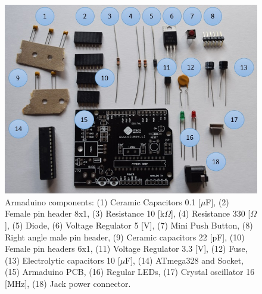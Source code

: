 \documentclass[12pt,letterpaper]{article}
\numberwithin{figure}{section}
\numberwithin{equation}{section}
\numberwithin{table}{section}
\begin{document}
\begin{figure}[H]
    \centering
    \includegraphics[scale=0.65]{Figuras/figure_10.jpg}
    \caption{Armaduino components: (1) Ceramic Capacitors 0.1 [$\mu$F], (2) Female pin header 8x1, (3) Resistance 10 [k$\Omega$], (4) Resistance 330 [$\Omega$], (5) Diode, (6) Voltage Regulator 5 [V], (7) Mini Push Button, (8) Right angle male pin header, (9) Ceramic capacitors 22 [pF], (10) Female pin headers 6x1, (11) Voltage Regulator 3.3 [V], (12) Fuse, (13) Electrolytic capacitors 10 [$\mu$F], (14) ATmega328 and Socket, (15) Armaduino PCB, (16) Regular LEDs, (17) Crystal oscillator 16 [MHz], (18) Jack power connector.}
    \label{fig:10}
\end{figure}
\end{document}
